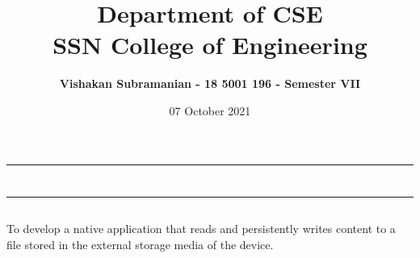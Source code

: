 \documentclass[12pt, a4]{article}
\title{\textbf{Department of CSE\\SSN College of Engineering}}
\author{\textbf{Vishakan Subramanian - 18 5001 196 - Semester VII}}
\date{07 October 2021}
\begin{document}
\maketitle
\hrule
\section*{}
\hrule
\bigskip

\subsection*{}
\subsection*{}
\begin{flushleft}

To develop a native application that reads and persistently writes content to a file stored in the external storage media of the device.

\end{flushleft}

\newpage
\subsection*{}
\begin{flushleft}

\end{flushleft}

\newpage
\subsection*{}
\begin{flushleft}

\end{flushleft}

\newpage
\subsection*{}
\begin{flushleft}

\end{flushleft}
\end{document}
